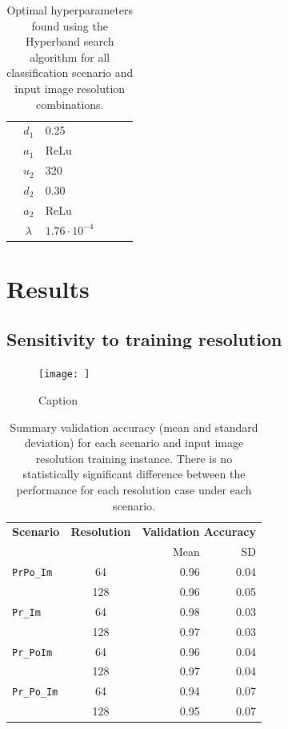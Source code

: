 \documentclass[Journal,letterpaper, SingleSpace, InsideFigs]{ascelike-new}
\begin{document}
\begin{table}[h!]
\begin{tabular}{l  c  p{1.75cm} p{1.75cm}  p{1.75cm} p{1.75cm}}
        & $d_1$   & 0.25 &  &      \\
        & $a_1$   & ReLu  &  &      \\
        & $u_2$   & 320 &  &      \\
        & $d_2$   & 0.30 &  &     \\
        & $a_2$   & ReLu &  &      \\
        & $\lambda$  & $1.76\cdot 10^{-4}$ &  &  &   \\ \bottomrule
    \end{tabular}
    \caption{Optimal hyperparameters found using the Hyperband search algorithm for all classification scenario and input image resolution combinations.}
    \label{tab:opt-hyp}
\end{table}
\section{Results}


\subsection{Sensitivity to training resolution}

\begin{figure}
    \centering
    \texttt{[image: ]}
    \caption{Caption}
    \label{fig:my_label}
\end{figure}

\begin{table}[h!]\small
    \centering
    \begin{tabular}{ l c r r}\toprule
\bf Scenario & \bf Resolution & \multicolumn{2}{c}{\bf Validation Accuracy}\\
& & Mean & SD \\\midrule
    \texttt{PrPo\_Im} & 64  & 0.96 & 0.04 \\
                      & 128 & 0.96 & 0.05 \\
    \texttt{Pr\_Im}   & 64  & 0.98 & 0.03 \\
                      & 128 & 0.97 & 0.03 \\
    \texttt{Pr\_PoIm} & 64  & 0.96 & 0.04 \\
                      & 128 & 0.97 & 0.04 \\
    \texttt{Pr\_Po\_Im}& 64  & 0.94 & 0.07 \\
                      & 128 & 0.95 & 0.07 \\ \bottomrule
    \end{tabular}
    \caption{Summary validation accuracy (mean and standard deviation) for each scenario and input image resolution training instance. There is no statistically significant difference between the performance for each resolution case under each scenario.}
    \label{tab:meanvalacc}
\end{table}
\end{document}
